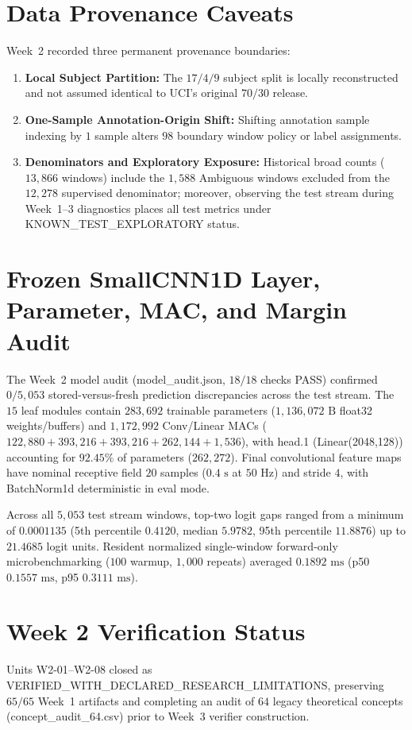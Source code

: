 \documentclass[11pt,oneside,a4paper]{report}
\newcommand{\code}[1]{{\small\upshape\ttfamily #1}}
\theoremstyle{remark}
\begin{document}
\section{Data Provenance Caveats}
Week~2 recorded three permanent provenance boundaries:
\begin{enumerate}[leftmargin=1.5em]
  \item \textbf{Local Subject Partition:} The $17/4/9$ subject split is locally reconstructed and not assumed identical to UCI's original $70/30$ release.
  \item \textbf{One-Sample Annotation-Origin Shift:} Shifting annotation sample indexing by $1$ sample alters $98$ boundary window policy or label assignments.
  \item \textbf{Denominators and Exploratory Exposure:} Historical broad counts ($13,866$ windows) include the $1,588$ Ambiguous windows excluded from the $12,278$ supervised denominator; moreover, observing the test stream during Week~1--3 diagnostics places all test metrics under \code{KNOWN\_TEST\_EXPLORATORY} status.
\end{enumerate}

\section{Frozen \code{SmallCNN1D} Layer, Parameter, MAC, and Margin Audit}
The Week~2 model audit (\code{model\_audit.json}, $18/18$ checks PASS) confirmed $0/5,053$ stored-versus-fresh prediction discrepancies across the test stream. The $15$ leaf modules contain $283,692$ trainable parameters ($1,136,072\text{ B}$ \code{float32} weights/buffers) and $1,172,992$ Conv/Linear MACs ($122,880 + 393,216 + 393,216 + 262,144 + 1,536$), with \code{head.1} (\code{Linear(2048,128)}) accounting for $92.45\%$ of parameters ($262,272$). Final convolutional feature maps have nominal receptive field $20$ samples ($0.4\text{ s}$ at $50\text{ Hz}$) and stride $4$, with \code{BatchNorm1d} deterministic in \code{eval} mode.

Across all $5,053$ test stream windows, top-two logit gaps ranged from a minimum of $0.0001135$ (5th percentile $0.4120$, median $5.9782$, 95th percentile $11.8876$) up to $21.4685$ logit units. Resident normalized single-window forward-only microbenchmarking ($100$ warmup, $1,000$ repeats) averaged $0.1892\text{ ms}$ (p50 $0.1557\text{ ms}$, p95 $0.3111\text{ ms}$).

\section{Week 2 Verification Status}
Units \code{W2-01}--\code{W2-08} closed as \code{VERIFIED\_WITH\_DECLARED\_RESEARCH\_LIMITATIONS}, preserving $65/65$ Week~1 artifacts and completing an audit of $64$ legacy theoretical concepts (\code{concept\_audit\_64.csv}) prior to Week~3 verifier construction.
\end{document}

